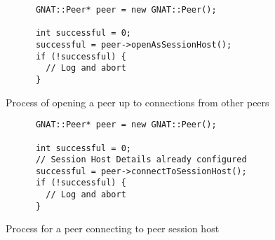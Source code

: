 \begin{figure}[!h]
  \centering
  \begin{lstlisting}
      GNAT::Peer* peer = new GNAT::Peer();

      int successful = 0;
      successful = peer->openAsSessionHost();
      if (!successful) {
        // Log and abort
      }
  \end{lstlisting}
  \caption{Process of opening a peer up to connections from other peers}
  \label{code:peer_conn_host}
\end{figure}


\begin{figure}[!h]
  \centering
  \begin{lstlisting}
      GNAT::Peer* peer = new GNAT::Peer();

      int successful = 0;
      // Session Host Details already configured
      successful = peer->connectToSessionHost();
      if (!successful) {
        // Log and abort
      }
  \end{lstlisting}
  \caption{Process for a peer connecting to peer session host}
  \label{code:peer_conn_join}
\end{figure}
